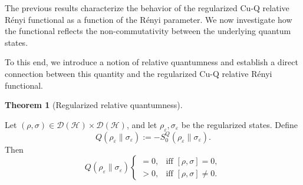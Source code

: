 \documentclass[a4paper, amsfonts, amssymb, amsmath, reprint, showkeys, nofootinbib, twoside, aps, pra]{revtex4-2}
\theoremstyle{definition}
\newtheorem{theorem}{Theorem}
\begin{document}
The previous results characterize the behavior of the regularized Cu-Q relative Rényi functional as a function of the Rényi parameter. We now investigate how the functional reflects the non-commutativity between the underlying quantum states.

To this end, we introduce a notion of relative quantumness and establish a direct connection between this quantity and the regularized Cu-Q relative Rényi functional.

\begin{theorem}[Regularized relative quantumness]\label{quantumness}

Let $(\rho,\sigma)\in\mathcal{D}(\mathcal{H})\times\mathcal{D}(\mathcal{H})$,
and let $\rho_\varepsilon,\sigma_\varepsilon$ be the regularized states. Define
\begin{equation}
  Q(\rho_\varepsilon\|\sigma_\varepsilon) := -S_0^Q(\rho_\varepsilon\|\sigma_\varepsilon).
\end{equation}
Then
\begin{equation}
  Q(\rho_\varepsilon\|\sigma_\varepsilon)
  \begin{cases}
    = 0, & \text{iff } [\rho,\sigma]=0,\\[6pt]
    > 0, & \text{iff } [\rho,\sigma]\neq 0.
  \end{cases}
\end{equation}
\end{theorem}
\end{document}
